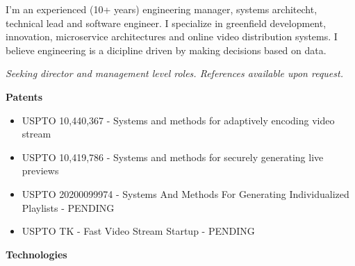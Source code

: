 \documentclass[12t]{article}
\begin{document}
I'm an experienced (10+ years) engineering manager, systems
architecht, technical lead and software engineer. I specialize in
greenfield development, innovation, microservice architectures and
online video distribution systems. I believe engineering is a
dicipline driven by making decisions based on data.

\textit{Seeking director and management level roles. References available upon request.}

\vspace{10pt}\textbf{Patents}

\vspace{5pt}\begin{small}
\begin{itemize}[nosep,label=,leftmargin=*]
\item USPTO 10,440,367 - Systems and methods for adaptively encoding video stream
\item USPTO 10,419,786 - Systems and methods for securely generating live previews
\item USPTO 20200099974 - Systems And Methods For Generating Individualized Playlists - {\tiny PENDING}
\item USPTO TK - Fast Video Stream Startup - {\tiny PENDING}
\end{itemize}
\end{small}

\vspace{10pt}\textbf{Technologies}
\end{document}
